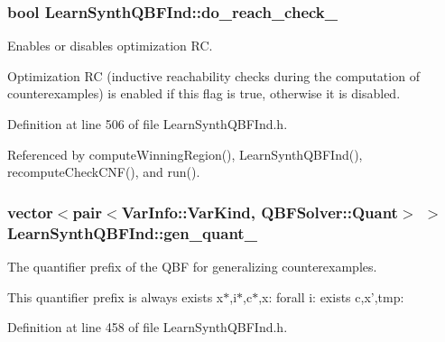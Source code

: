 \hypertarget{classLearnSynthQBFInd_af87e4a2c1d17c4c5bc398082d6d3e365}{
\subsubsection[{do\-\_\-reach\-\_\-check\-\_\-}]{\setlength{\rightskip}{0pt plus 5cm}bool Learn\-Synth\-Q\-B\-F\-Ind\-::do\-\_\-reach\-\_\-check\-\_\-\hspace{0.3cm}{\ttfamily [protected]}}}\label{classLearnSynthQBFInd_af87e4a2c1d17c4c5bc398082d6d3e365}


Enables or disables optimization R\-C. 

Optimization R\-C (inductive reachability checks during the computation of counterexamples) is enabled if this flag is true, otherwise it is disabled. 

Definition at line 506 of file Learn\-Synth\-Q\-B\-F\-Ind.\-h.



Referenced by compute\-Winning\-Region(), Learn\-Synth\-Q\-B\-F\-Ind(), recompute\-Check\-C\-N\-F(), and run().

\hypertarget{classLearnSynthQBFInd_a1a20b68cc735e4bbc0cc7030329acb4d}{
\subsubsection[{gen\-\_\-quant\-\_\-}]{\setlength{\rightskip}{0pt plus 5cm}vector$<$pair$<${\bf Var\-Info\-::\-Var\-Kind}, {\bf Q\-B\-F\-Solver\-::\-Quant}$>$ $>$ Learn\-Synth\-Q\-B\-F\-Ind\-::gen\-\_\-quant\-\_\-\hspace{0.3cm}{\ttfamily [protected]}}}\label{classLearnSynthQBFInd_a1a20b68cc735e4bbc0cc7030329acb4d}


The quantifier prefix of the Q\-B\-F for generalizing counterexamples. 

This quantifier prefix is always exists x$\ast$,i$\ast$,c$\ast$,x\-: forall i\-: exists c,x',tmp\-: 

Definition at line 458 of file Learn\-Synth\-Q\-B\-F\-Ind.\-h.



